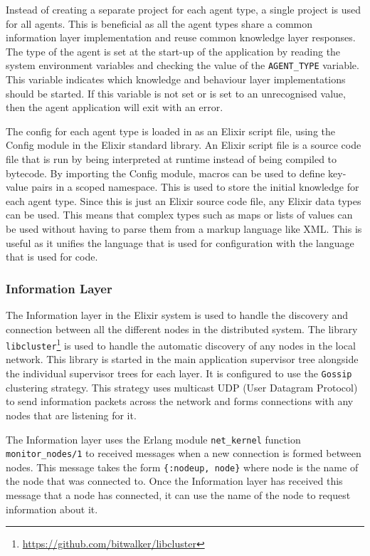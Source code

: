 Instead of creating a separate project for each agent type, a single project is used for all agents.
This is beneficial as all the agent types share a common information layer implementation and reuse common knowledge layer responses.
The type of the agent is set at the start-up of the application by reading the system environment variables and checking the value of the \verb|AGENT_TYPE| variable.
This variable indicates which knowledge and behaviour layer implementations should be started.
If this variable is not set or is set to an unrecognised value, then the agent application will exit with an error.

The config for each agent type is loaded in as an Elixir script file, using the Config module in the Elixir standard library.
An Elixir script file is a source code file that is run by being interpreted at runtime instead of being compiled to bytecode.
By importing the Config module, macros can be used to define key-value pairs in a scoped namespace.
This is used to store the initial knowledge for each agent type.
Since this is just an Elixir source code file, any Elixir data types can be used.
This means that complex types such as maps or lists of values can be used without having to parse them from a markup language like XML\@.
This is useful as it unifies the language that is used for configuration with the language that is used for code.

\subsubsection{Information Layer}

The Information layer in the Elixir system is used to handle the discovery and connection between all the different nodes in the distributed system.
The library \verb|libcluster|\footnote{\url{https://github.com/bitwalker/libcluster}} is used to handle the automatic discovery of any nodes in the local network.
This library is started in the main application supervisor tree alongside the individual supervisor trees for each layer.
It is configured to use the \verb|Gossip| clustering strategy.
This strategy uses multicast UDP (User Datagram Protocol) to send information packets across the network and forms connections with any nodes that are listening for it.

The Information layer uses the Erlang module \verb|net_kernel| function\\ \verb|monitor_nodes/1| to received messages when a new connection is formed between nodes.
This message takes the form \verb|{:nodeup, node}| where node is the name of the node that was connected to.
Once the Information layer has received this message that a node has connected, it can use the name of the node to request information about it.

